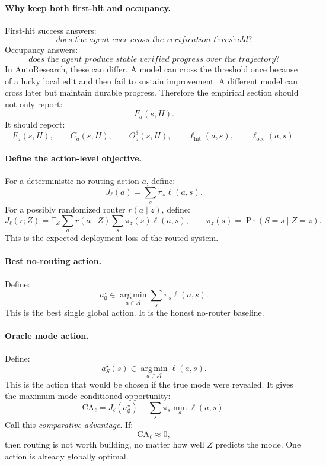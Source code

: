 \documentclass{article}
\providecommand{\argmin}{\operatorname*{arg\,min}}
\begin{document}
\paragraph{Why keep both first-hit and occupancy.}
First-hit success answers:
\[
    \textit{does the agent ever cross the verification threshold?}
\]
Occupancy answers:
\[
    \textit{does the agent produce stable verified progress over the trajectory?}
\]
In AutoResearch, these can differ.
A model can cross the threshold once because of a lucky local edit and then fail to sustain
improvement.
A different model can cross later but maintain durable progress.
Therefore the empirical section should not only report:
\[
    F_a(s,H).
\]
It should report:
\[
    F_a(s,H),
    \qquad
    C_a(s,H),
    \qquad
    O_a^\delta(s,H),
    \qquad
    \ell_{\mathrm{hit}}(a,s),
    \qquad
    \ell_{\mathrm{occ}}(a,s).
\]

\paragraph{Define the action-level objective.}
For a deterministic no-routing action \(a\), define:
\[
    J_\ell(a)
    =
    \sum_s \pi_s \ell(a,s).
\]
For a possibly randomized router \(r(a\mid z)\), define:
\[
    J_\ell(r;Z)
    =
    \mathbb E_Z
    \sum_a r(a\mid Z)
    \sum_s \pi_z(s)\ell(a,s),
    \qquad
    \pi_z(s)=\Pr(S=s\mid Z=z).
\]
This is the expected deployment loss of the routed system.

\paragraph{Best no-routing action.}
Define:
\[
    a^\star_{\emptyset}
    \in
    \argmin_{a\in\mathcal A}
    \sum_s \pi_s\ell(a,s).
\]
This is the best single global action.
It is the honest no-router baseline.

\paragraph{Oracle mode action.}
Define:
\[
    a^\star_S(s)
    \in
    \argmin_{a\in\mathcal A}\ell(a,s).
\]
This is the action that would be chosen if the true mode were revealed.
It gives the maximum mode-conditioned opportunity:
\[
    \mathrm{CA}_{\ell}
    =
    J_\ell(a^\star_{\emptyset})
    -
    \sum_s \pi_s\min_a \ell(a,s).
\]
Call this \emph{comparative advantage}.
If:
\[
    \mathrm{CA}_{\ell}\approx 0,
\]
then routing is not worth building, no matter how well \(Z\) predicts the mode.
One action is already globally optimal.
\end{document}
